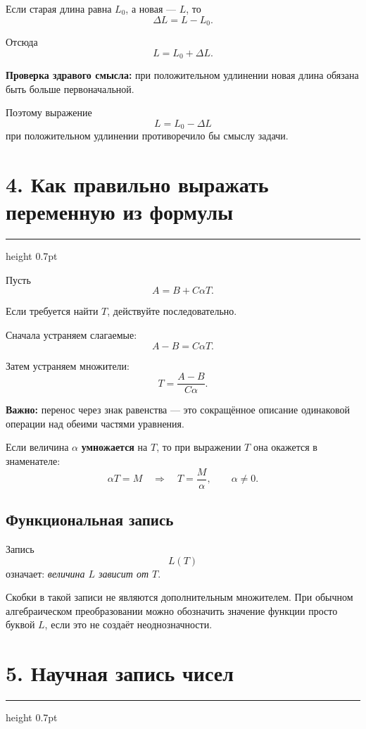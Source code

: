 \documentclass[a4paper,12pt]{article}
\newcommand{\sectionline}{%
    \par\vspace{0.15em}
    {\color{lightaccent}\hrule height 0.7pt}
    \vspace{0.7em}
}
\newcommand{\key}[1]{\textcolor{darkaccent}{\textbf{#1}}}
\begin{document}
Если старая длина равна \(L_0\), а новая --- \(L\), то
\[
\Delta L=L-L_0.
\]

Отсюда
\[
L=L_0+\Delta L.
\]

\key{Проверка здравого смысла:} при положительном удлинении новая длина
обязана быть больше первоначальной.

Поэтому выражение
\[
L=L_0-\Delta L
\]
при положительном удлинении противоречило бы смыслу задачи.

\section*{\textcolor{darkaccent}{4. Как правильно выражать переменную из формулы}}

\sectionline

Пусть
\[
A=B+C\alpha T.
\]

Если требуется найти \(T\), действуйте последовательно.

Сначала устраняем слагаемые:
\[
A-B=C\alpha T.
\]

Затем устраняем множители:
\[
T=\frac{A-B}{C\alpha}.
\]

\key{Важно:} перенос через знак равенства --- это сокращённое описание
одинаковой операции над обеими частями уравнения.

Если величина \(\alpha\) \textbf{умножается} на \(T\), то при выражении \(T\)
она окажется в знаменателе:
\[
\alpha T=M
\quad\Longrightarrow\quad
T=\frac{M}{\alpha},
\qquad \alpha\ne0.
\]

\subsection*{\textcolor{accent}{Функциональная запись}}

Запись
\[
L(T)
\]
означает: \textit{величина \(L\) зависит от \(T\)}.

Скобки в такой записи не являются дополнительным множителем.
При обычном алгебраическом преобразовании можно обозначить значение функции
просто буквой \(L\), если это не создаёт неоднозначности.


\newpage

\section*{\textcolor{darkaccent}{5. Научная запись чисел}}

\sectionline
\end{document}
